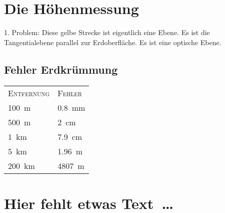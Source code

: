 \section{Die Höhenmessung}
\begin{list}{}{}
\item[1. Problem:] %
Diese gelbe Strecke ist eigentlich eine Ebene.
Es ist die Tangentialebene parallel zur Erdoberfläche.
Es ist eine optische Ebene.
\end{list}

\subsection{Fehler Erdkrümmung}
\vspace{0.5cm}
\begin{center}
\end{center}
\vspace{0.5cm}

\begin{tabular}{ll}
\textsc{Entfernung} & \textsc{Fehler} \\
\SI{100}{\metre} & \SI{0,8}{\milli\metre} \\
\SI{500}{\metre} & \SI{2}{\centi\metre} \\
\SI{1}{\kilo\metre} & \SI{7,9}{\centi\metre} \\
\SI{5}{\kilo\metre} & \SI{1,96}{\metre} \\
\SI{200}{\kilo\metre} & \SI{4807}{\metre} \\
\end{tabular}



\section*{Hier fehlt etwas Text~\dots}

